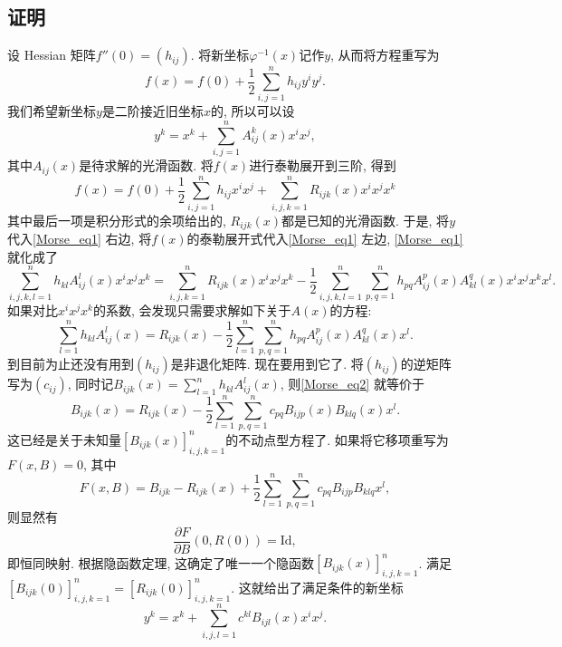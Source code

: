 \subsection{证明}
设 Hessian 矩阵$f''(0)=(h_{ij})$. 将新坐标$\varphi^{-1}(x)$记作$y$, 从而将方程重写为
\begin{equation}\label{Morse_eq1}
f(x)=f(0)+\frac{1}{2}\sum_{i,j=1}^nh_{ij}y^iy^j.
\end{equation}
我们希望新坐标$y$是二阶接近旧坐标$x$的, 所以可以设
$$
y^k
=x^k+\sum_{i,j=1}^nA^k_{ij}(x)x^ix^j,
$$
其中$A_{ij}(x)$是待求解的光滑函数. 将$f(x)$进行泰勒展开到三阶, 得到
$$
f(x)=f(0)+\frac{1}{2}\sum_{i,j=1}^nh_{ij}x^ix^j+
\sum_{i,j,k=1}^nR_{ijk}(x)x^ix^jx^k
$$
其中最后一项是积分形式的余项给出的, $R_{ijk}(x)$都是已知的光滑函数. 于是, 将$y$代入\autoref{Morse_eq1} 右边, 将$f(x)$的泰勒展开式代入\autoref{Morse_eq1} 左边, \autoref{Morse_eq1} 就化成了
$$
\sum_{i,j,k,l=1}^nh_{kl}A^l_{ij}(x)x^ix^jx^k
=\sum_{i,j,k=1}^nR_{ijk}(x)x^ix^jx^k
-\frac{1}{2}\sum_{i,j,k,l=1}^n\sum_{p,q=1}^nh_{pq}A^p_{ij}(x)A^q_{kl}(x)x^ix^jx^kx^l.
$$
如果对比$x^ix^jx^k$的系数, 会发现只需要求解如下关于$A(x)$的方程:
\begin{equation}\label{Morse_eq2}
\sum_{l=1}^nh_{kl}A^l_{ij}(x)
=R_{ijk}(x)
-\frac{1}{2}\sum_{l=1}^n\sum_{p,q=1}^nh_{pq}A^p_{ij}(x)A^q_{kl}(x)x^l.
\end{equation}
到目前为止还没有用到$(h_{ij})$是非退化矩阵. 现在要用到它了. 将$(h_{ij})$的逆矩阵写为$(c_{ij})$, 同时记$B_{ijk}(x)=\sum_{l=1}^nh_{kl}A^l_{ij}(x)$, 则\autoref{Morse_eq2} 就等价于
$$
B_{ijk}(x)
=R_{ijk}(x)-\frac{1}{2}\sum_{l=1}^n\sum_{p,q=1}^nc_{pq}B_{ijp}(x)B_{klq}(x)x^l.
$$
这已经是关于未知量$[B_{ijk}(x)]_{i,j,k=1}^n$的不动点型方程了. 如果将它移项重写为$F(x,B)=0$, 其中
$$
F(x,B)=B_{ijk}-R_{ijk}(x)+\frac{1}{2}\sum_{l=1}^n\sum_{p,q=1}^nc_{pq}B_{ijp}B_{klq}x^l,
$$
则显然有
$$
\frac{\partial F}{\partial B}(0,R(0))=\mathrm{Id},
$$
即恒同映射. 根据隐函数定理, 这确定了唯一一个隐函数$[B_{ijk}(x)]_{i,j,k=1}^n$. 满足$[B_{ijk}(0)]_{i,j,k=1}^n=[R_{ijk}(0)]_{i,j,k=1}^n$. 这就给出了满足条件的新坐标
$$
y^k
=x^k+\sum_{i,j,l=1}^nc^{kl}B_{ijl}(x)x^ix^j.
$$ 